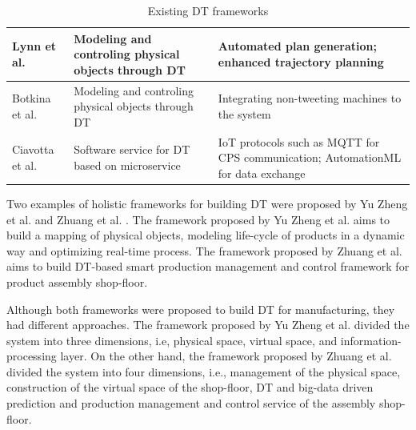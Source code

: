 \documentclass[article,table]{aaltoseries}
\begin{document}
\begin{table}[]
\begin{tabular}{|l|p{4.5cm}|p{7.3cm}|}
		Lynn et al. \cite{lynn2018realization}                                                          & Modeling and controling physical objects through DT                                     & Automated plan generation; enhanced trajectory planning                                                                                                                                                                                                             \\ \hline
		Botkina et al. \cite{botkina2018digital}                                                           & Modeling and controling physical objects through DT                                     & Integrating non-tweeting machines to the system                                                                                                                                                                                                                     \\ \hline
		Ciavotta et al. \cite{ciavotta2017microservice} & Software service for DT based on microservice                                         & IoT protocols such as MQTT for CPS communication; AutomationML for data exchange                                                                                                                                                                                    \\ \hline
	\end{tabular}
	\caption{Existing DT frameworks}
	\label{tab:framework_tools}
\end{table}

Two examples of holistic frameworks for building DT were proposed by Yu Zheng et al. \cite{zheng2019application} and Zhuang et al. \cite{Zhuang2018}. The framework proposed by Yu Zheng et al. aims to build a mapping of physical objects, modeling life-cycle of products in a dynamic way and optimizing real-time process. The framework proposed by Zhuang et al. aims to build DT-based smart production management and control framework for product assembly shop-floor.

Although both frameworks were proposed to build DT for manufacturing, they had different approaches. The framework proposed by Yu Zheng et al. divided the system into three dimensions, i.e, physical space, virtual space, and information-processing layer. On the other hand, the framework proposed by Zhuang et al. divided the system into four dimensions, i.e., management of the physical space, construction of the virtual space of the shop-floor, DT and big-data driven prediction and production management and control service of the assembly shop-floor.
\end{document}
